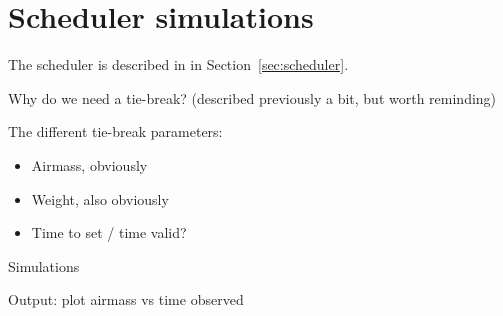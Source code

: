 
\newpage
\section{Scheduler simulations}
\label{sec:scheduler_sims}
\begin{colsection}


\begin{colsection}

The scheduler is described in in Section~\ref{sec:scheduler}.

Why do we need a tie-break? (described previously a bit, but worth reminding)

The different tie-break parameters:
\begin{itemize}
    \item Airmass, obviously
    \item Weight, also obviously
    \item Time to set / time valid?
\end{itemize}

Simulations

Output: plot airmass vs time observed


\end{colsection}

\end{colsection}


\newpage
